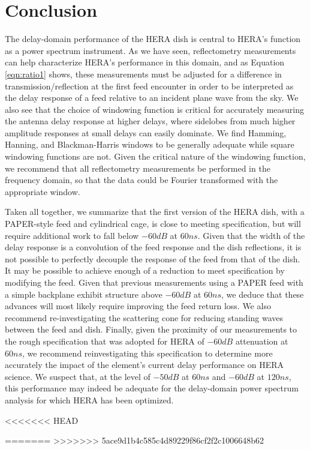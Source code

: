 \documentclass[twocolumn]{emulateapj}
\begin{document}
\section{Conclusion}

The delay-domain performance of the HERA dish is central to HERA's function as a power spectrum instrument.
As we have seen, reflectometry measurements can help characterize HERA's performance in this domain, and
as Equation \ref{eqn:ratio1} shows, these measurements must be adjusted for a difference in transmission/reflection
at the first feed encounter in order to be interpreted as the delay response of a feed relative to an incident
plane wave from the sky.  We also see that the choice of windowing function is critical for accurately measuring the
antenna delay response at higher delays, where sidelobes from much higher amplitude responses at small delays can easily
dominate.  We find Hamming, Hanning, and Blackman-Harris windows to be generally adequate while square windowing functions are not.
Given the critical nature of the windowing function, we recommend that all reflectometry measurements be performed in the
frequency domain, so that the data could be Fourier transformed with the appropriate window.

Taken all together, we summarize that the first version of the HERA dish, with a PAPER-style feed and cylindrical cage, is close to meeting
specification, but will require additional work to fall below $-60dB$ at $60ns$.  Given that the width of the delay response is a convolution
of the feed response and the dish reflections, it is not possible to perfectly decouple the response of the feed from that of the dish.
It may be possible to achieve enough of a reduction to meet specification by modifying the feed.
Given that previous measurements using a PAPER feed with a simple backplane exhibit structure above $-60dB$ at $60ns$,
we deduce that these advances will most likely require improving the feed return loss.  We also recommend re-investigating the scattering
cone for reducing standing waves between the feed and dish.  Finally, given the proximity of our measurements to the rough 
specification that was adopted for 
HERA of $-60dB$ attenuation at $60ns$, we recommend reinvestigating this specification to determine more accurately the impact of 
the element's current delay performance on HERA science.  We suspect that, at the level of $-50dB$ at $60ns$ and $-60dB$ at $120ns$, this
performance may indeed be adequate for the delay-domain power spectrum analysis for which HERA has been optimized.

<<<<<<< HEAD

=======
>>>>>>> 5ace9d1b4c585c4d89229f86cf2f2c1006648b62
{}

\end{document}
